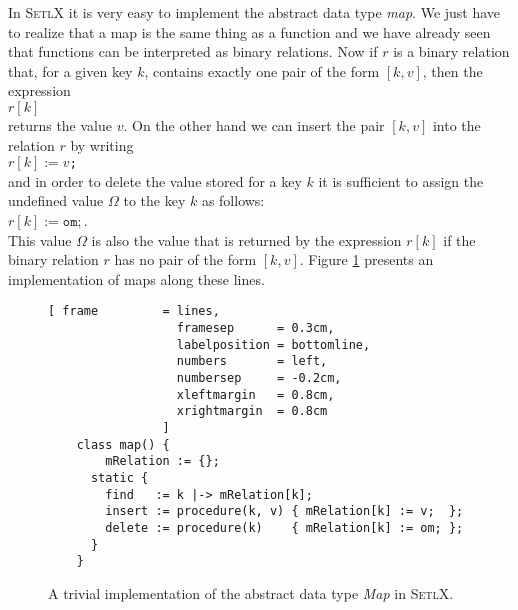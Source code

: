 In \textsc{SetlX} it is very easy to implement the abstract data type  \textsl{map}.  We just have
to realize that a map is the same thing as a function and we have already seen that functions can
be interpreted as binary relations.
Now if $r$ is a binary relation that, for a given key $k$,  contains exactly one pair of the form
$[k,v]$, then the expression
\\[0.1cm]
\hspace*{1.3cm} $r[k]$
\\[0.1cm]
returns the value $v$.  On the other hand we can insert the pair $[k,v]$ into the relation $r$ by
writing
\\[0.1cm]
\hspace*{1.3cm} $r[k] := v$\texttt{;} \\[0.1cm]
and in order to delete the value stored for a key  $k$ it is sufficient to assign the undefined value
$\Omega$ to the key $k$ as follows: \\[0.1cm]
\hspace*{1.3cm} $r[k] := \mathtt{om;}$. \\[0.1cm]
This value $\Omega$ is also the value that is returned by the expression  $r[k]$ if
the binary  relation $r$ has no pair of the form $[k,v]$.
Figure  \ref{fig:map-trivial.stlx} presents an implementation of maps along these lines.


\begin{figure}[!ht]
  \centering
\begin{Verbatim}[ frame         = lines, 
                  framesep      = 0.3cm, 
                  labelposition = bottomline,
                  numbers       = left,
                  numbersep     = -0.2cm,
                  xleftmargin   = 0.8cm,
                  xrightmargin  = 0.8cm
                ]
    class map() {
        mRelation := {};
      static {
        find   := k |-> mRelation[k];
        insert := procedure(k, v) { mRelation[k] := v;  };
        delete := procedure(k)    { mRelation[k] := om; };
      }
    }
\end{Verbatim}
\vspace*{-0.3cm}
  \caption{A trivial implementation of the abstract data type \textsl{Map} in \textsc{SetlX}.}
  \label{fig:map-trivial.stlx}
\end{figure} 



